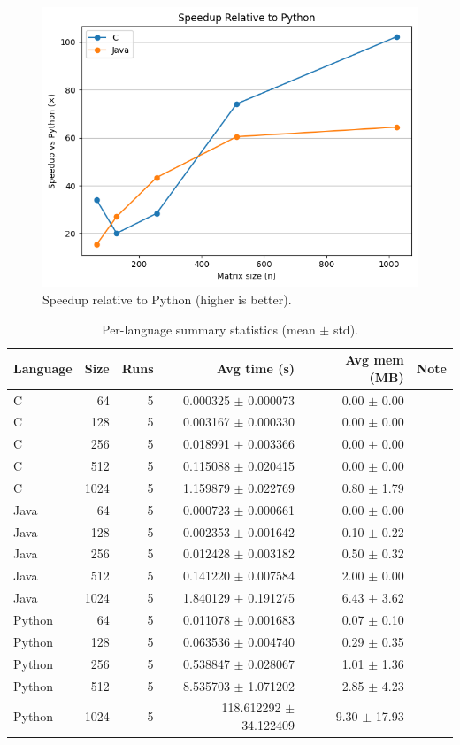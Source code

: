 \documentclass[11pt,a4paper]{article}
\begin{document}
\begin{figure}[H]
  \centering
  \includegraphics[width=.85\linewidth]{speedup_vs_python.png}
  \caption{Speedup relative to Python (higher is better).}
\end{figure}



\begin{table}[H]
\centering
\caption{Per-language summary statistics (mean $\pm$ std).}
\label{tab:summary}
\begin{tabular}{lrrrrr}
\toprule
Language & Size & Runs & Avg time (s) & Avg mem (MB) & Note \\
\midrule
C & 64 & 5 & 0.000325 $\pm$ 0.000073 & 0.00 $\pm$ 0.00 & ~ \\
C & 128 & 5 & 0.003167 $\pm$ 0.000330 & 0.00 $\pm$ 0.00 & ~ \\
C & 256 & 5 & 0.018991 $\pm$ 0.003366 & 0.00 $\pm$ 0.00 & ~ \\
C & 512 & 5 & 0.115088 $\pm$ 0.020415 & 0.00 $\pm$ 0.00 & ~ \\
C & 1024 & 5 & 1.159879 $\pm$ 0.022769 & 0.80 $\pm$ 1.79 & ~ \\
Java & 64 & 5 & 0.000723 $\pm$ 0.000661 & 0.00 $\pm$ 0.00 & ~ \\
Java & 128 & 5 & 0.002353 $\pm$ 0.001642 & 0.10 $\pm$ 0.22 & ~ \\
Java & 256 & 5 & 0.012428 $\pm$ 0.003182 & 0.50 $\pm$ 0.32 & ~ \\
Java & 512 & 5 & 0.141220 $\pm$ 0.007584 & 2.00 $\pm$ 0.00 & ~ \\
Java & 1024 & 5 & 1.840129 $\pm$ 0.191275 & 6.43 $\pm$ 3.62 & ~ \\
Python & 64 & 5 & 0.011078 $\pm$ 0.001683 & 0.07 $\pm$ 0.10 & ~ \\
Python & 128 & 5 & 0.063536 $\pm$ 0.004740 & 0.29 $\pm$ 0.35 & ~ \\
Python & 256 & 5 & 0.538847 $\pm$ 0.028067 & 1.01 $\pm$ 1.36 & ~ \\
Python & 512 & 5 & 8.535703 $\pm$ 1.071202 & 2.85 $\pm$ 4.23 & ~ \\
Python & 1024 & 5 & 118.612292 $\pm$ 34.122409 & 9.30 $\pm$ 17.93 & ~ \\
\bottomrule
\end{tabular}
\end{table}
\end{document}
